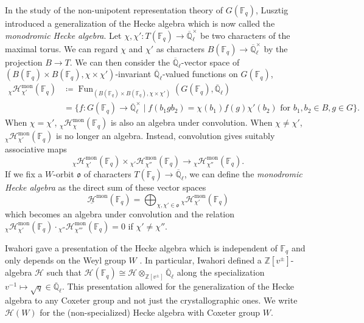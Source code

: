 \documentclass{amsart}
\newcommand{\Q}{\mathbb{Q}}
\newcommand{\Z}{\mathbb{Z}}
\newcommand{\F}{\mathbb{F}}
\newcommand{\scrH}{\mathcal{H}}
\DeclareMathOperator{\Fun}{Fun}
\newcommand{\fr}[1]{\mathfrak{#1}}
\DeclareMathOperator{\mon}{mon}
\theoremstyle{definition}
\numberwithin{equation}{subsection}
\begin{document}
In the study of the non-unipotent representation theory of $G (\F_q)$, Lusztig \cite{Lus19} introduced a generalization of the Hecke algebra which is now called the \emph{monodromic Hecke algebra}.
Let $\chi, \chi' : T (\F_q) \to \overline{\Q}_{\ell}^{\times}$ be two characters of the maximal torus.
We can regard $\chi$ and $\chi'$ as characters $B (\F_q) \to \overline{\Q}_{\ell}^{\times}$ by the projection $B \to T$.
We can then consider the $\overline{\Q}_{\ell}$-vector space of $(B (\F_q) \times B (\F_q), \chi \times \chi')$-invariant  $\overline{\Q}_\ell$-valued functions on $G (\F_q)$,
\begin{align*}
    {}_{\chi} \scrH_{\chi'}^{\mon} (\F_q) &\coloneq \Fun_{(B (\F_q) \times B (\F_q), \chi \times \chi')} (G (\F_q), \overline{\Q}_{\ell}) \\
    &= \{ f : G (\F_q) \to  \overline{\Q}_{\ell}^{\times} \mid f(b_1g b_2) = \chi (b_1) f(g) \chi' (b_2) \text{ for } b_1, b_2 \in B, g \in G\}.
\end{align*}
When $\chi = \chi'$, ${}_{\chi} \scrH_{\chi}^{\mon} (\F_q)$ is also an algebra under convolution. When $\chi \neq \chi'$,  ${}_{\chi} \scrH_{\chi'}^{\mon} (\F_q)$ is no longer an algebra.
Instead, convolution gives suitably associative maps
\[{}_{\chi} \scrH_{\chi'}^{\mon} (\F_q) \times {}_{\chi'} \scrH_{\chi''}^{\mon} (\F_q) \to {}_{\chi} \scrH_{\chi''}^{\mon} (\F_q).\]
If we fix a $W$-orbit $\fr{o}$ of characters $T (\F_q) \to \overline{\Q}_{\ell}$, we can define the \emph{monodromic Hecke algebra} as the direct sum of these vector spaces
\[\underline{\scrH}^{\mon} (\F_q) = \bigoplus_{\chi, \chi' \in \fr{o}} {}_{\chi} \scrH_{\chi'}^{\mon} (\F_q)\]
which becomes an algebra under convolution and the relation ${}_{\chi} \scrH_{\chi'}^{\mon} (\F_q) \cdot {}_{\chi''} \scrH_{\chi'''}^{\mon} (\F_q) = 0$ if $\chi' \neq \chi''$.

Iwahori gave a presentation of the Hecke algebra which is independent of $\F_q$ and only depends on the Weyl group $W$ \cite{Iwa}.
In particular, Iwahori defined a $\Z [v^{\pm}]$-algebra $\scrH$ such that $\scrH (\F_q) \cong \scrH \otimes_{\Z [v^{\pm}]} \overline{\Q}_{\ell}$ along the specialization $v^{-1} \mapsto \sqrt{q} \in \overline{\Q}_{\ell}$.
This presentation allowed for the generalization of the Hecke algebra to any Coxeter group and not just the crystallographic ones.
We write $\scrH (W)$ for the (non-specialized) Hecke algebra with Coxeter group $W$. 
\end{document}
